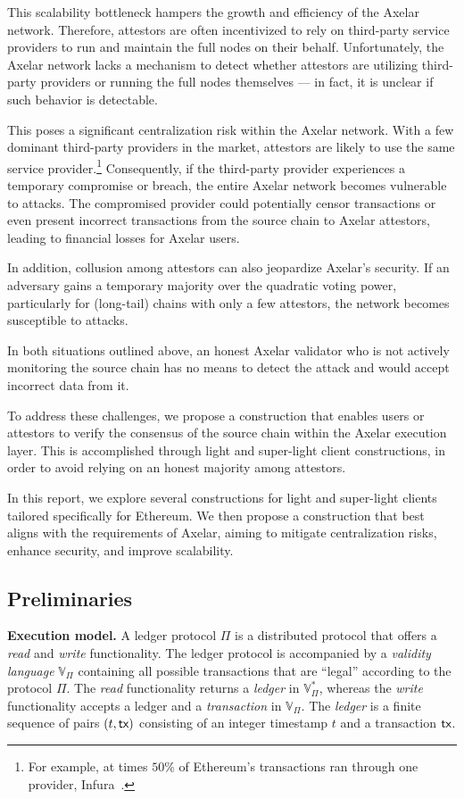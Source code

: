 This scalability bottleneck hampers the growth and efficiency of the Axelar network. Therefore, attestors are often incentivized to rely on third-party service providers to run and maintain the full nodes on their behalf. Unfortunately, the Axelar network lacks a mechanism to detect whether attestors are utilizing third-party providers or running the full nodes themselves --- in fact, it is unclear if such behavior is detectable.

This poses a significant centralization risk within the Axelar network. With a few dominant third-party providers in the market, attestors are likely to use the same service provider.\footnote{For example, at times $50$\% of Ethereum's transactions ran through one provider, Infura~\cite{infura}.} Consequently, if the third-party provider experiences a temporary compromise or breach, the entire Axelar network becomes vulnerable to attacks. The compromised provider could potentially censor transactions or even present incorrect transactions from the source chain to Axelar attestors, leading to financial losses for Axelar users.

In addition, collusion among attestors can also jeopardize Axelar's security. If an adversary gains a temporary majority over the quadratic voting power, particularly for (long-tail) chains with only a few attestors, the network becomes susceptible to attacks. 

In both situations outlined above, an honest Axelar validator who is not actively monitoring the source chain has no means to detect the attack and would accept incorrect data from it.

To address these challenges, we propose a construction that enables users or attestors to verify the consensus of the source chain within the Axelar execution layer. This is accomplished through light and super-light client constructions, in order to avoid relying on an honest majority among attestors.

In this report, we explore several constructions for light and super-light clients tailored specifically for Ethereum. We then propose a construction that best aligns with the requirements of Axelar, aiming to mitigate centralization risks, enhance security, and improve scalability.

\subsection{Preliminaries}
\noindent
\textbf{Execution model.}
A ledger protocol $\Pi$ is a distributed protocol that offers
a \emph{read} and \emph{write} functionality.
The ledger protocol is accompanied by a \emph{validity language}
$\mathbb{V}_{\Pi}$ containing all possible transactions that are ``legal''
according to the protocol $\Pi$.
The
\emph{read} functionality returns a \emph{ledger} in $\mathbb{V}_{\Pi}^*$,
whereas the \emph{write} functionality accepts a ledger and a \emph{transaction} in $\mathbb{V}_\Pi$.
The \emph{ledger} is a finite sequence of pairs $(t, \textsf{tx})$ consisting
of an integer timestamp $t$ and a transaction $\textsf{tx}$.


